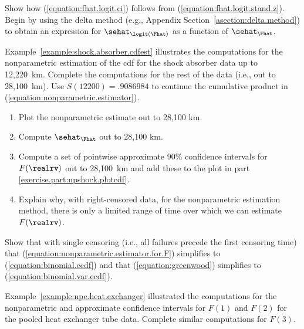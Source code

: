 \begin{exercise1}
Show how (\ref{equation:fhat.logit.ci}) follows from
(\ref{equation:fhat.logit.stand.z}).  Begin by using the delta method
(e.g., Appendix Section~\ref{asection:delta.method}) to obtain an expression
for $\sehat_{\logit(\Fhat)}$ as a function of
$\sehat_{\Fhat}$.
\end{exercise1}

\begin{exercise}
Example~\ref{example:shock.absorber.cdfest} illustrates the
computations for the nonparametric estimation of the cdf for the shock
absorber data up to 12,220~km. Complete the computations for the rest
of the data (i.e., out to 28,100~km). Use $S(12200)=.9086984$ to continue
the cumulative product in (\ref{equation:nonparametric.estimator}).
\begin{enumerate}
\item
\label{exercise.part:npshock.plotcdf}
Plot the nonparametric estimate out to
28,100 km.
\item
Compute $\sehat_{\Fhat}$ out to
28,100 km.
\item
Compute a set of pointwise approximate 90\% confidence intervals for
$F(\realrv)$ out to 28,100~km and add these to the plot in part
\ref{exercise.part:npshock.plotcdf}.
\item
Explain why, with right-censored data, for the nonparametric
estimation method, there is only a limited range of time over which we
can estimate $F(\realrv)$.
\end{enumerate}
\end{exercise}


\begin{exercise1}
Show that with single censoring (i.e., all failures precede the first
censoring time) that
(\ref{equation:nonparametric.estimator.for.F}) simplifies to
(\ref{equation:binomial.ecdf}) and that (\ref{equation:greenwood})
simplifies to (\ref{equation:binomial.var.ecdf}).
\end{exercise1}


\begin{exercise}
Example~\ref{example:npe.heat.exchanger} illustrated the computations
for the nonparametric and approximate confidence intervals for $F(1)$ 
and $F(2)$ for the pooled
heat exchanger tube data. Complete similar computations for $F(3)$.
\end{exercise}

